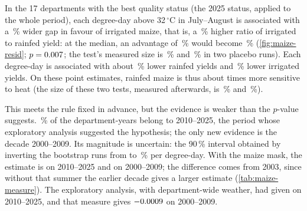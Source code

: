In the 17 departments with the best quality status (the 2025 status, applied to the whole period), each degree-day above 32\,$^{\circ}$C in July--August is associated with a \QonePct\,\% wider gap in favour of irrigated maize, that is, a \QonePct\,\% higher ratio of irrigated to rainfed yield: at the median, an advantage of \GapMedianPct\,\% would become \GapMedianAfterPct\,\% (\cref{fig:maize-resid}; $p = 0.007$; the test's measured size is \QoneSizeWCR\,\% and \PowerCheckSize\,\% in two placebo runs). Each degree-day is associated with about \QoneRainfedPct\,\% lower rainfed yields and \QoneIrrigatedPct\,\% lower irrigated yields. On these point estimates, rainfed maize is thus about \QoneRatio{} times more sensitive to heat (the size of these two tests, measured afterwards, is \HtwobSize\,\% and \HtwocSize\,\%).

This meets the rule fixed in advance, but the evidence is weaker than the $p$-value suggests. \ExploSharePct\,\% of the department-years belong to 2010--2025, the period whose exploratory analysis suggested the hypothesis; the only new evidence is the decade 2000--2009. Its magnitude is uncertain: the 90\,\% interval obtained by inverting the bootstrap runs from \CiNinetyLow{} to \CiNinetyHigh\,\% per degree-day. With the maize mask, the estimate is \MaskRecent{} on 2010--2025 and \MaskEarly{} on 2000--2009; the difference comes from 2003, since without that summer the earlier decade gives a larger estimate (\cref{tab:maize-measure}). The exploratory analysis, with department-wide weather, had given \AreaRecent{} on 2010--2025, and that measure gives $-0.0009$ on 2000--2009.

